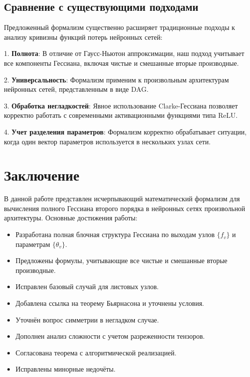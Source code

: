 \documentclass[11pt]{article}
\begin{document}
\subsection{Сравнение с существующими подходами}

Предложенный формализм существенно расширяет традиционные подходы к анализу кривизны функций потерь нейронных сетей:

1. \textbf{Полнота}: В отличие от Гаусс-Ньютон аппроксимации, наш подход учитывает все компоненты Гессиана,
включая чистые и смешанные вторые производные.

2. \textbf{Универсальность}: Формализм применим к произвольным архитектурам нейронных сетей, представленным в виде DAG.

3. \textbf{Обработка негладкостей}: Явное использование Clarke-Гессиана позволяет корректно работать с
современными активационными функциями типа ReLU.

4. \textbf{Учет разделения параметров}: Формализм корректно обрабатывает ситуации, когда один вектор
параметров используется в нескольких узлах сети.

\section{Заключение}

В данной работе представлен исчерпывающий математический формализм для вычисления полного Гессиана второго
порядка в нейронных сетях произвольной архитектуры. Основные достижения работы:

\begin{itemize}
  \item Разработана полная блочная структура Гессиана по выходам узлов $\{f_v\}$ и параметрам $\{\theta_v\}$.
  \item Предложены формулы, учитывающие все чистые и смешанные вторые производные.
  \item Исправлен базовый случай для листовых узлов.
  \item Добавлена ссылка на теорему Бьярнасона и уточнены условия.
  \item Уточнён вопрос симметрии в негладком случае.
  \item Дополнен анализ сложности с учетом разреженности тензоров.
  \item Согласована теорема с алгоритмической реализацией.
  \item Исправлены минорные недочёты.
\end{itemize}
\end{document}
